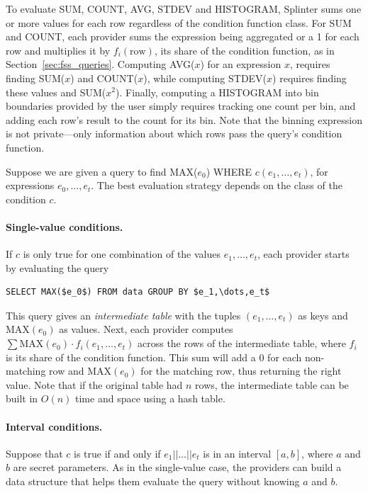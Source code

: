 To evaluate SUM, COUNT, AVG, STDEV and HISTOGRAM, Splinter
sums one or more values for each row regardless of the condition
function class.
For SUM and COUNT, each provider sums the expression being aggregated or a 1 for each
row and multiplies it by $f_i(\mathrm{row})$, its share of the condition
function, as in Section~\ref{sec:fss_queries}.
Computing AVG($x$) for an expression $x$, requires finding SUM($x$) and COUNT($x$),
while computing STDEV($x$) requires finding these values and SUM($x^2$).
Finally, computing a HISTOGRAM into bin boundaries provided by the user simply
requires tracking one count per bin, and adding each row's result to the
count for its bin. Note that the binning expression is not
private---only information about which rows pass the query's condition function.

\label{sec:min-max}
Suppose we are given a query to find MAX($e_0$) WHERE $c(e_1,\dots,e_t)$,
for expressions $e_0,\dots,e_t$.
The best evaluation strategy depends on the class of the condition $c$.

\paragraph{Single-value conditions.} If $c$ is only true for one combination
of the values $e_1,\dots,e_t$, each provider starts by evaluating the query
\begin{Verbatim}[commandchars=\\\{\},codes={\catcode`$=3\catcode`_=8}]
SELECT MAX($e_0$) FROM data GROUP BY $e_1,\dots,e_t$
\end{Verbatim}
This query gives an \emph{intermediate table} with the tuples $(e_1,\dots,e_t)$
as keys and $\mathrm{MAX}(e_0)$ as values.
Next, each provider computes $\sum \mathrm{MAX}(e_0) \cdot f_i(e_1,\dots,e_t)$
across the rows of the intermediate table, where $f_i$ is its share of the
condition function.
This sum will add a 0 for each non-matching row and $\mathrm{MAX}(e_0)$ for the
matching row, thus returning the right value.
Note that if the original table had $n$ rows, the intermediate table can be built
in $O(n)$ time and space using a hash table.

\paragraph{Interval conditions.}
Suppose that $c$ is true if and only if $e_1||\dots||e_t$ is in an interval $[a,b]$,
where $a$ and $b$ are secret parameters.
As in the single-value case, the providers can build a data structure that helps
them evaluate the query without knowing $a$ and $b$.

